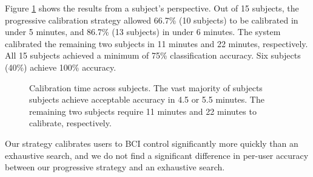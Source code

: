 

Figure \ref{fig:calibration_results} shows the results from a subject's perspective. Out of 15 subjects, the progressive calibration strategy allowed 66.7\% (10 subjects) to be calibrated in under 5 minutes, and 86.7\% (13 subjects) in under 6 minutes. The system calibrated the remaining two subjects in 11 minutes and 22 minutes, respectively. All 15 subjects achieved a minimum of 75\% classification accuracy. Six subjects (40\%) achieve 100\% accuracy.

\begin{figure}[!h]
  \vspace{-0.2cm}
  \centering

  
  \def\angle{0}
\def\radius{2.9}
\def\cyclelist{{"red","green","blue","yellow"}}
\newcount\cyclecount {}
\newcount\ind {}
  \vspace{-0.1cm}
  
  \caption{Calibration time across subjects. The vast majority of subjects subjects achieve acceptable accuracy in 4.5 or 5.5 minutes. The remaining two subjects require 11 minutes and 22 minutes to calibrate, respectively. }
  \label{fig:calibration_results}
  \vspace{-0.1cm}
\end{figure}

Our strategy calibrates users to BCI control significantly more quickly than an exhaustive search, and we do not find a significant difference in per-user accuracy between our progressive strategy and an exhaustive search. 

